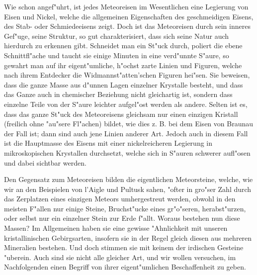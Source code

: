 \documentclass[a4paper, 11pt, oneside, german]{article}
\begin{document}
Wie schon angef"uhrt, ist jedes Meteoreisen im Wesentlichen eine Legierung von Eisen und Nickel, welche die allgemeinen Eigenschaften des geschmeidigen Eisens, des Stab- oder Schmiedeeisens zeigt. Doch ist das Meteoreisen durch sein inneres Gef"uge, seine Struktur, so gut charakterisiert, dass sich seine Natur auch hierdurch zu erkennen gibt. Schneidet man ein St"uck durch, poliert die ebene Schnittfl"ache und taucht sie einige Minuten in eine verd"unnte S"aure, so gewahrt man auf ihr eigent"umliche, h"ochst zarte Linien und Figuren, welche nach ihrem Entdecker die Widmannst"atten'schen Figuren hei"sen. Sie beweisen, dass die ganze Masse aus d"unnen Lagen einzelner Krystalle besteht, und dass das Ganze auch in chemischer Beziehung nicht gleichartig ist, sondern dass einzelne Teile von der S"aure leichter aufgel"ost werden als andere. Selten ist es, dass das ganze St"uck des Meteoreisens gleichsam nur einen einzigen Kristall (freilich ohne "au"sere Fl"achen) bildet, wie dies z. B. bei dem Eisen von Braunau der Fall ist; dann sind auch jene Linien anderer Art. Jedoch auch in diesem Fall ist die Hauptmasse des Eisens mit einer nickelreicheren Legierung in mikroskopischen Krystallen durchsetzt, welche sich in S"auren schwerer aufl"osen und dabei sichtbar werden.

Den Gegensatz zum Meteoreisen bilden die eigentlichen Meteorsteine, welche, wie wir an den Beispielen von l'Aigle und Pultusk sahen, "ofter in gro"ser Zahl durch das Zerplatzen eines einzigen Meteors umhergestreut werden, obwohl in den meisten F"allen nur einige Steine, Bruchst"ucke eines gr"o"seren, herabst"urzen, oder selbst nur ein einzelner Stein zur Erde f"allt. Woraus bestehen nun diese Massen? Im Allgemeinen haben sie eine gewisse "Ahnlichkeit mit unseren kristallinischen Gebirgsarten, insofern sie in der Regel gleich diesen aus mehreren Mineralien bestehen. Und doch stimmen sie mit keinem der irdischen Gesteine "uberein. Auch sind sie nicht alle gleicher Art, und wir wollen versuchen, im Nachfolgenden einen Begriff von ihrer eigent"umlichen Beschaffenheit zu geben.
\end{document}
